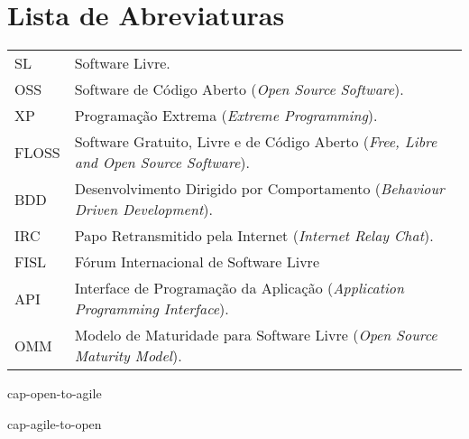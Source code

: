 \documentclass[12pt,twoside,letterpaper]{book}
\begin{document}
\tableofcontents %


\chapter{Lista de Abreviaturas}
\begin{tabular}{ll}
  SL       & Software Livre.\\
  OSS         & Software de Código Aberto (\emph{Open Source Software}).\\
  XP       & Programação Extrema (\emph{Extreme Programming}).\\
  FLOSS       & Software Gratuito, Livre e de Código Aberto (\emph{Free, Libre and Open Source
    Software}).\\
  BDD       & Desenvolvimento Dirigido por Comportamento (\emph{Behaviour Driven Development}).\\
  IRC       & Papo Retransmitido pela Internet (\emph{Internet Relay Chat}).\\
  FISL       & Fórum Internacional de Software Livre\\
  API       & Interface de Programação da Aplicação (\emph{Application Programming Interface}).\\ 
  OMM       & Modelo de Maturidade para Software Livre (\emph{Open Source Maturity Model}).\\
\end{tabular}



\mainmatter

\onehalfspacing %


cap-open-to-agile %

cap-agile-to-open %
\appendix
\end{document}
